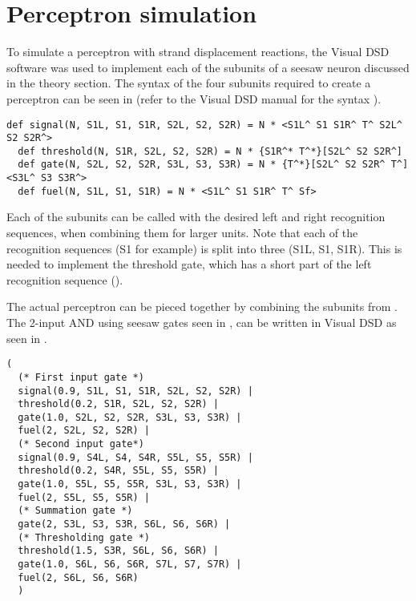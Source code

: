 \section{Perceptron simulation}

To simulate a perceptron with strand displacement reactions, the Visual DSD software was used to implement each of the subunits of a seesaw neuron discussed in the theory section. The syntax of the four subunits required to create a perceptron can be seen in  (refer to the Visual DSD manual for the syntax \cite{dsdmanual}).

\begin{lstlisting}[float, label=dsd_subunits, caption=Visual DSD definition of the seesaw gate subunits.]
  def signal(N, S1L, S1, S1R, S2L, S2, S2R) = N * <S1L^ S1 S1R^ T^ S2L^ S2 S2R^>
  def threshold(N, S1R, S2L, S2, S2R) = N * {S1R^* T^*}[S2L^ S2 S2R^]
  def gate(N, S2L, S2, S2R, S3L, S3, S3R) = N * {T^*}[S2L^ S2 S2R^ T^]<S3L^ S3 S3R^>
  def fuel(N, S1L, S1, S1R) = N * <S1L^ S1 S1R^ T^ Sf>
\end{lstlisting}

Each of the subunits can be called with the desired left and right recognition sequences, when combining them for larger units. Note that each of the recognition sequences (S1 for example) is split into three (S1L, S1, S1R). This is needed to implement the threshold gate, which has a short part of the left recognition sequence ().

The actual perceptron can be pieced together by combining the subunits from . The 2-input AND using seesaw gates seen in , can be written in Visual DSD as seen in .

\begin{lstlisting}[float, label=dsd_and_gate, caption=Code for a seesaw neuron in Visual DSD]
  (
  (* First input gate *)
  signal(0.9, S1L, S1, S1R, S2L, S2, S2R) |
  threshold(0.2, S1R, S2L, S2, S2R) |
  gate(1.0, S2L, S2, S2R, S3L, S3, S3R) |
  fuel(2, S2L, S2, S2R) |
  (* Second input gate*)
  signal(0.9, S4L, S4, S4R, S5L, S5, S5R) |
  threshold(0.2, S4R, S5L, S5, S5R) |
  gate(1.0, S5L, S5, S5R, S3L, S3, S3R) |
  fuel(2, S5L, S5, S5R) |
  (* Summation gate *)
  gate(2, S3L, S3, S3R, S6L, S6, S6R) |
  (* Thresholding gate *)
  threshold(1.5, S3R, S6L, S6, S6R) |
  gate(1.0, S6L, S6, S6R, S7L, S7, S7R) |
  fuel(2, S6L, S6, S6R)
  )
\end{lstlisting}

